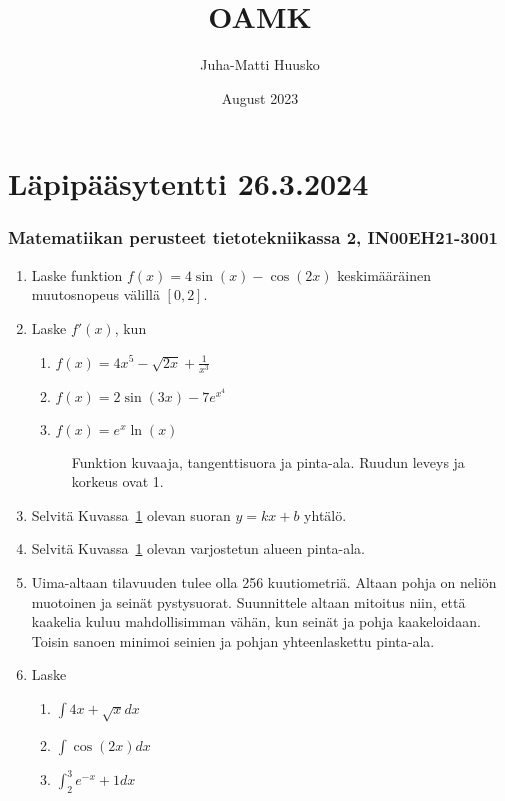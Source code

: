 \documentclass[12pt]{article}
\title{OAMK}
\author{Juha-Matti Huusko}
\date{August 2023}
\begin{document}
\thispagestyle{empty}

\section*{Läpipääsytentti 26.3.2024}
\subsubsection*{Matematiikan perusteet tietotekniikassa 2, IN00EH21-3001}

\begin{enumerate}
\item Laske funktion $f(x)=4\sin(x)-\cos(2x)$ keskimääräinen muutosnopeus välillä $[0,2]$.
\item Laske $f'(x)$, kun
\begin{enumerate}
\item $f(x)=4x^5-\sqrt{2x}+\frac{1}{x^3}$
\item $f(x)=2\sin(3x)-7e^{x^4}$
\item $f(x)=e^x\ln(x)$
\end{enumerate}
\begin{figure}[h!]
    \centering
\def\px{1}
\def\py{2}
\def\qx{4}
\def\qy{3}
    \caption{Funktion kuvaaja, tangenttisuora ja pinta-ala. Ruudun leveys ja korkeus ovat 1.}
    \label{fig:eksponentti-deri-int}
\end{figure}
\item Selvitä Kuvassa~\ref{fig:eksponentti-deri-int} olevan suoran $y=kx+b$ yhtälö.
\item Selvitä Kuvassa~\ref{fig:eksponentti-deri-int} olevan varjostetun alueen pinta-ala.
\item Uima-altaan tilavuuden tulee olla 256 kuutiometriä. Altaan pohja on neliön muotoinen ja seinät pystysuorat. Suunnittele altaan mitoitus niin, että kaakelia kuluu mahdollisimman vähän, kun seinät ja pohja kaakeloidaan. Toisin sanoen minimoi seinien ja pohjan yhteenlaskettu pinta-ala.
\item Laske
\begin{enumerate}
\item $\int 4x+\sqrt{x}dx$
\item $\int \cos(2x)dx$
\item $\int_2^3 e^{-x}+1dx$
\end{enumerate}
\end{enumerate}
\end{document}
